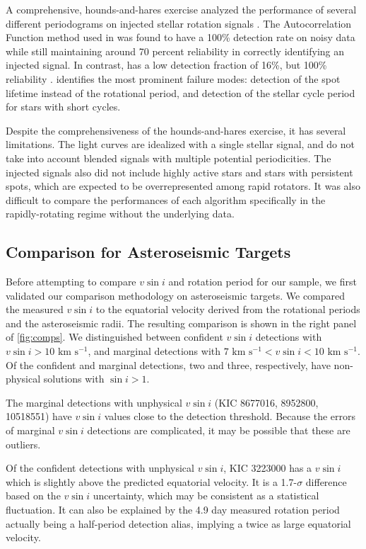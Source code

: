 \documentclass[manuscript]{aastex6}
\newcommand{\vsini}{\ensuremath{v \sin i}}
\newcommand{\kms}{\textrm{~km~s}\ensuremath{^{-1}}}
\begin{document}
A comprehensive, hounds-and-hares exercise analyzed the performance of
several different periodograms on injected stellar rotation signals 
\citep{Aigrain15}. The Autocorrelation Function method used in 
\citet{McQuillan14} was found to have a 100\% detection rate on noisy
data while still maintaining around 70 percent reliability in correctly
identifying an injected signal. In contrast, \citet{Nielsen13} has a low
detection fraction of 16\%, but 100\% reliability \citep{Aigrain15}.
\citet{Aigrain15} identifies the most prominent failure modes: detection
of the spot lifetime instead of the rotational period, and detection of
the stellar cycle period for stars with short cycles.

Despite the comprehensiveness of the hounds-and-hares exercise, it has
several limitations. The light curves are idealized with a single
stellar signal, and do not take into account blended signals with
multiple potential periodicities. The injected signals also did not
include highly active stars and stars with persistent spots, which are
expected to be overrepresented among rapid rotators. It was also
difficult to compare the performances of each algorithm specifically in
the rapidly-rotating regime without the underlying data.

\subsection{Comparison for Asteroseismic Targets}
\label{sec:astero}

Before attempting to compare \vsini{} and rotation period for our sample, we 
first validated our comparison methodology on asteroseismic targets. We 
compared the measured \vsini{} to the equatorial velocity 
derived from the rotational periods and the asteroseismic radii. The resulting 
comparison is shown in the right panel of \cref{fig:comps}. We distinguished 
between confident \vsini{} detections with \(\vsini > 10 \kms\), and marginal 
detections with \(7 \kms < \vsini < 10 \kms\). Of the confident and
marginal detections, two and three, respectively, have non-physical solutions 
with \(\sin i > 1\). 

The marginal detections with unphysical \vsini{} (KIC 8677016, 8952800, 10518551) 
have \vsini{} values close to the detection threshold. Because the errors of 
marginal \vsini{} detections are complicated, it may be possible that these 
are outliers. 

Of the confident detections with unphysical \vsini{}, KIC 3223000 has a
\vsini{} which is slightly above the predicted equatorial velocity. It
is a 1.7-\(\sigma\) difference based on the \vsini{} uncertainty, which
may be consistent as a statistical fluctuation. It can also
be explained by the 4.9 day measured rotation period actually being a 
half-period detection alias, implying a twice as large equatorial velocity. 
\end{document}
